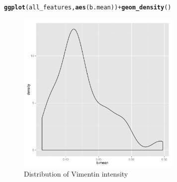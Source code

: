 \documentclass{article}\usepackage[]{graphicx}\usepackage[]{color}
\makeatletter
\newcommand{\hlopt}[1]{\textcolor[rgb]{0,0,0}{#1}}%
\newcommand{\hlstd}[1]{\textcolor[rgb]{0.345,0.345,0.345}{#1}}%
\newcommand{\hlkwd}[1]{\textcolor[rgb]{0.737,0.353,0.396}{\textbf{#1}}}%
\newenvironment{kframe}{%
 \def\at@end@of@kframe{}%
 \ifinner\ifhmode%
  \def\at@end@of@kframe{\end{minipage}}%
  \begin{minipage}{\columnwidth}%
 \fi\fi%
 \def\FrameCommand##1{\hskip\@totalleftmargin \hskip-\fboxsep
 \colorbox{shadecolor}{##1}\hskip-\fboxsep
     \hskip-\linewidth \hskip-\@totalleftmargin \hskip\columnwidth}%
 \MakeFramed {\advance\hsize-\width
   \@totalleftmargin\z@ \linewidth\hsize
   \@setminipage}}%
 {\par\unskip\endMakeFramed%
 \at@end@of@kframe}
\newenvironment{knitrout}{}{} %
\makeatother
\begin{document}
\begin{knitrout}
\color{fgcolor}\begin{kframe}
\begin{alltt}
\hlkwd{ggplot}\hlstd{(all_features,} \hlkwd{aes}\hlstd{(b.mean))} \hlopt{+} \hlkwd{geom_density}\hlstd{()}
\end{alltt}
\end{kframe}\begin{figure}

{\centering \includegraphics[width=300px]{knit_figure/figintens-1} 

}

\caption[Distribution of Vimentin intensity]{Distribution of Vimentin intensity\label{fig:intens}}
\end{figure}


\end{knitrout}
\end{document}
